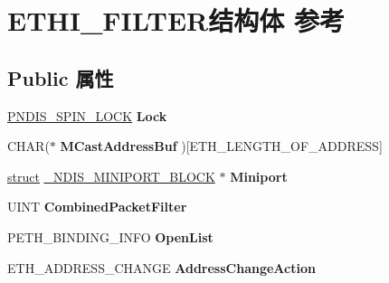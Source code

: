 \hypertarget{struct_e_t_h_i___f_i_l_t_e_r}{}\section{E\+T\+H\+I\+\_\+\+F\+I\+L\+T\+E\+R结构体 参考}
\label{struct_e_t_h_i___f_i_l_t_e_r}
\subsection*{Public 属性}
\begin{DoxyCompactItemize}
\item 
\mbox{\label{struct_e_t_h_i___f_i_l_t_e_r_a6542684d2caf6b09092e9ee7ce81a923}} 
\hyperlink{struct___n_d_i_s___s_p_i_n___l_o_c_k}{P\+N\+D\+I\+S\+\_\+\+S\+P\+I\+N\+\_\+\+L\+O\+CK} {\bfseries Lock}
\item 
\mbox{\label{struct_e_t_h_i___f_i_l_t_e_r_a3da3f9bab35636c6087c0b21348ff6a7}} 
C\+H\+AR($\ast$ {\bfseries M\+Cast\+Address\+Buf} )\mbox{[}E\+T\+H\+\_\+\+L\+E\+N\+G\+T\+H\+\_\+\+O\+F\+\_\+\+A\+D\+D\+R\+E\+SS\mbox{]}
\item 
\mbox{\label{struct_e_t_h_i___f_i_l_t_e_r_aa9fde78c83f589138f75f5e397a64699}} 
\hyperlink{interfacestruct}{struct} \hyperlink{struct___n_d_i_s___m_i_n_i_p_o_r_t___b_l_o_c_k}{\+\_\+\+N\+D\+I\+S\+\_\+\+M\+I\+N\+I\+P\+O\+R\+T\+\_\+\+B\+L\+O\+CK} $\ast$ {\bfseries Miniport}
\item 
\mbox{\label{struct_e_t_h_i___f_i_l_t_e_r_a8f335612377502e90429135a98b78484}} 
U\+I\+NT {\bfseries Combined\+Packet\+Filter}
\item 
\mbox{\label{struct_e_t_h_i___f_i_l_t_e_r_aeba09bb997511f6d0b2b5a1ae4f758e2}} 
P\+E\+T\+H\+\_\+\+B\+I\+N\+D\+I\+N\+G\+\_\+\+I\+N\+FO {\bfseries Open\+List}
\item 
\mbox{\label{struct_e_t_h_i___f_i_l_t_e_r_aedc0c0c80e07fc30b06460ea1043c831}} 
E\+T\+H\+\_\+\+A\+D\+D\+R\+E\+S\+S\+\_\+\+C\+H\+A\+N\+GE {\bfseries Address\+Change\+Action}
\item 
\mbox{\label{struct_e_t_h_i___f_i_l_t_e_r_ac7be59f14604093728651c26f2cf27b2}} 

\end{DoxyCompactItemize}

